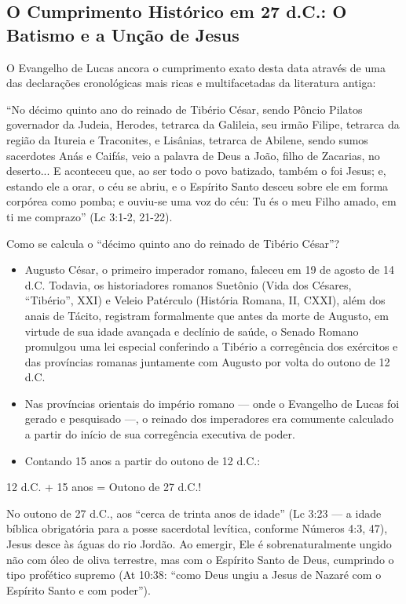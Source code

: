 \subsection{O Cumprimento Histórico em 27 d.C.: O Batismo e a Unção de Jesus}


O Evangelho de Lucas ancora o cumprimento exato desta data através de uma das declarações cronológicas mais ricas e multifacetadas da literatura antiga:

``No décimo quinto ano do reinado de Tibério César, sendo Pôncio Pilatos governador da Judeia, Herodes, tetrarca da Galileia, seu irmão Filipe, tetrarca da região da Itureia e Traconites, e Lisânias, tetrarca de Abilene, sendo sumos sacerdotes Anás e Caifás, veio a palavra de Deus a João, filho de Zacarias, no deserto... E aconteceu que, ao ser todo o povo batizado, também o foi Jesus; e, estando ele a orar, o céu se abriu, e o Espírito Santo desceu sobre ele em forma corpórea como pomba; e ouviu-se uma voz do céu: Tu és o meu Filho amado, em ti me comprazo'' (Lc 3:1-2, 21-22).

Como se calcula o ``décimo quinto ano do reinado de Tibério César''?
\begin{itemize}
  \item Augusto César, o primeiro imperador romano, faleceu em 19 de agosto de 14 d.C. Todavia, os historiadores romanos Suetônio (Vida dos Césares, ``Tibério'', XXI) e Veleio Patérculo (História Romana, II, CXXI), além dos anais de Tácito, registram formalmente que antes da morte de Augusto, em virtude de sua idade avançada e declínio de saúde, o Senado Romano promulgou uma lei especial conferindo a Tibério a corregência dos exércitos e das províncias romanas juntamente com Augusto por volta do outono de 12 d.C.
  \item Nas províncias orientais do império romano — onde o Evangelho de Lucas foi gerado e pesquisado —, o reinado dos imperadores era comumente calculado a partir do início de sua corregência executiva de poder.
  \item Contando 15 anos a partir do outono de 12 d.C.:
\end{itemize}

12 d.C. + 15 anos = Outono de 27 d.C.!

No outono de 27 d.C., aos ``cerca de trinta anos de idade'' (Lc 3:23 — a idade bíblica obrigatória para a posse sacerdotal levítica, conforme Números 4:3, 47), Jesus desce às águas do rio Jordão. Ao emergir, Ele é sobrenaturalmente ungido não com óleo de oliva terrestre, mas com o Espírito Santo de Deus, cumprindo o tipo profético supremo (At 10:38: ``como Deus ungiu a Jesus de Nazaré com o Espírito Santo e com poder'').

